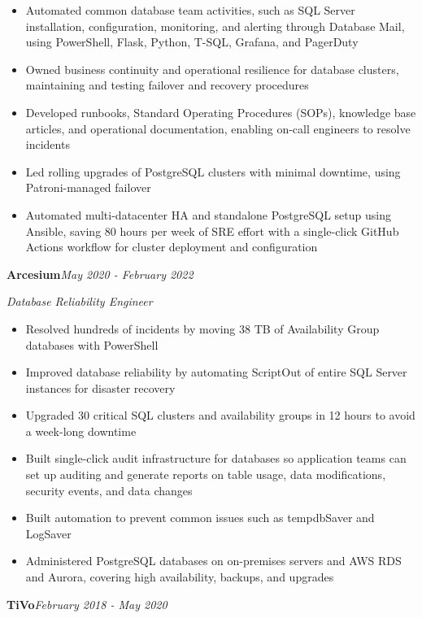 \documentclass[10pt,a4paper]{article}
\begin{document}
\begin{itemize}
  \item Automated common database team activities, such as SQL Server installation, configuration, monitoring, and alerting through Database Mail, using PowerShell, Flask, Python, T-SQL, Grafana, and PagerDuty
  \item Owned business continuity and operational resilience for database clusters, maintaining and testing failover and recovery procedures
  \item Developed runbooks, Standard Operating Procedures (SOPs), knowledge base articles, and operational documentation, enabling on-call engineers to resolve incidents
  \item Led rolling upgrades of PostgreSQL clusters with minimal downtime, using Patroni-managed failover
  \item Automated multi-datacenter HA and standalone PostgreSQL setup using Ansible, saving 80 hours per week of SRE effort with a single-click GitHub Actions workflow for cluster deployment and configuration
\end{itemize}
\vspace{14.7pt}
\noindent\textbf{Arcesium}\hfill \textit{May 2020 - February 2022}

\textit{Database Reliability Engineer}\\[-5pt]
\begin{itemize}
  \item Resolved hundreds of incidents by moving 38 TB of Availability Group databases with PowerShell
  \item Improved database reliability by automating ScriptOut of entire SQL Server instances for disaster recovery
  \item Upgraded 30 critical SQL clusters and availability groups in 12 hours to avoid a week-long downtime
  \item Built single-click audit infrastructure for databases so application teams can set up auditing and generate reports on table usage, data modifications, security events, and data changes
  \item Built automation to prevent common issues such as tempdbSaver and LogSaver
  \item Administered PostgreSQL databases on on-premises servers and AWS RDS and Aurora, covering high availability, backups, and upgrades
\end{itemize}
\vspace{14.7pt}
\noindent\textbf{TiVo}\hfill \textit{February 2018 - May 2020}
\end{document}
